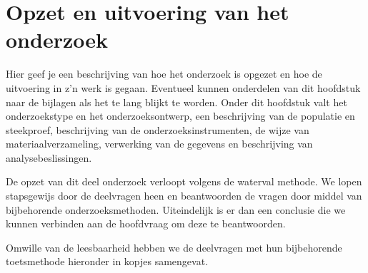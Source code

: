 \documentclass{article}
\begin{document}
\section{Opzet en uitvoering van het onderzoek}
Hier geef je een beschrijving van hoe het onderzoek is opgezet en hoe de uitvoering in z’n werk is gegaan. Eventueel kunnen onderdelen van dit hoofdstuk naar de bijlagen als het te lang blijkt te worden. Onder dit hoofdstuk valt het onderzoekstype en het onderzoeksontwerp, een beschrijving van de populatie en steekproef, beschrijving van de onderzoeksinstrumenten, de wijze van materiaalverzameling, verwerking van de gegevens en beschrijving van analysebeslissingen.

De opzet van dit deel onderzoek verloopt volgens de waterval methode. We lopen stapsgewijs door de deelvragen heen en beantwoorden de vragen door middel van bijbehorende onderzoeksmethoden. Uiteindelijk is er dan een conclusie die we kunnen verbinden aan de hoofdvraag om deze te beantwoorden.

Omwille van de leesbaarheid hebben we de deelvragen met hun bijbehorende toetsmethode hieronder in kopjes samengevat.
\end{document}
